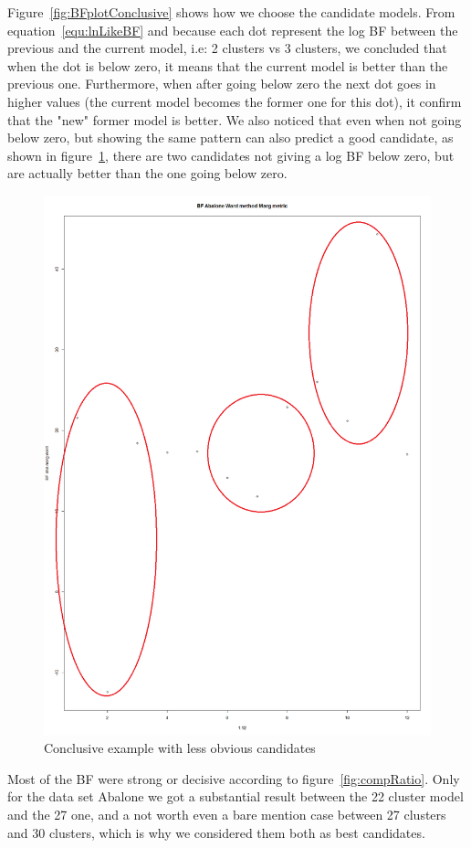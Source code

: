 \documentclass[twocolumn,12pt]{article}
\begin{document}
Figure~\ref{fig:BFplotConclusive} shows how we choose the candidate models. From equation~\ref{equ:lnLikeBF} and because each dot represent the log BF between the previous and the current model, i.e: 2 clusters vs 3 clusters, we concluded that when the dot is below zero, it means that the current model is better than the previous one. Furthermore, when after going below zero the next dot goes in higher values (the current model becomes the former one for this dot), it confirm that the "new" former model is better.
We also noticed that even when not going below zero, but showing the same pattern can also predict a good candidate, as shown in figure~\ref{fig:notbelowzero}, there are two candidates not giving a log BF below zero, but are actually better than the one going below zero.
\begin{figure}[!]
    \centering
    \includegraphics[scale=0.3]{img/BFplotNotBelowZero.png}
    \caption{Conclusive example with less obvious candidates}
    \label{fig:notbelowzero}
\end{figure}
Most of the BF were strong or decisive according to figure~\ref{fig:compRatio}. Only for the data set Abalone we got a substantial result between the 22 cluster model and the 27 one, and a not worth even a bare mention case between 27 clusters and 30 clusters, which is why we considered them both as best candidates.
\end{document}
